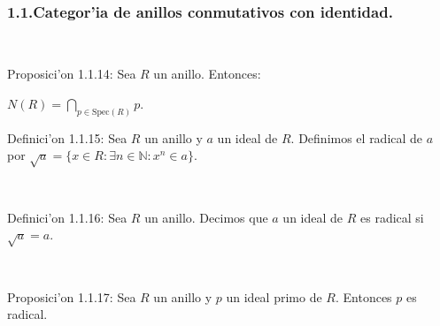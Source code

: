 \documentclass[10pt]{beamer}
\renewcommand{\N}{\mathbb{N}}
\renewcommand{\Sp}{\text{Spec}}
\begin{document}
\\
\begin{frame}
\frametitle{1.1.Categor'ia de anillos conmutativos con identidad.}\\
\begin{block}{Proposici'on 1.1.14:}
Sea $R$ un anillo. Entonces:\\ 
 \begin{center}
 $\displaystyle N(R)= \bigcap _{p \in \Sp(R)}{p}$.\\
 \end{center}
\end{block}




\begin{block}{Definici'on 1.1.15:}
Sea $R$ un anillo y $a$ un ideal de $R$. Definimos el radical de $a$ por $\sqrt{a}=\{x \in R:\exists n \in \N :x^n \in a \}$.\\
\end{block}
\\
\begin{block}{Definici'on 1.1.16:} 
Sea $R$ un anillo. Decimos que $a$ un ideal de $R$ es radical si $\sqrt{a}=a$.\\
\end{block}
\\
\begin{block}{Proposici'on 1.1.17:}
 Sea $R$ un anillo y $p$ un ideal primo de $R$. Entonces $p$ es radical.\\
\end{block}
\vspace{4cm}
\end{frame}
\end{document}
